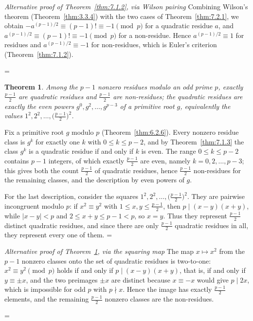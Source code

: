 \documentclass[11pt]{article}
\makeatletter
\let\nt@closedisplay\]
\def\nt@guardedclose{\@ifnextchar\par{\nt@closeafterpar}{\@ifnextchar\end{\postdisplaypenalty\@M\nt@closedisplay}{\nt@closedisplay}}}
\def\nt@closeafterpar\par{\@ifnextchar\par{\nt@closeafterpar}{\@ifnextchar\end{\postdisplaypenalty\@M\nt@closedisplay\par}{\nt@closedisplay\par}}}
\renewenvironment{proof}[1][\proofname]{\par
  \pushQED{\qed}\normalfont\topsep\medskipamount\edef\nt@afterproof{\@endparpenalty=\the\@endparpenalty\relax}\@beginparpenalty\@M\@endparpenalty\@M\let\]\nt@guardedclose\trivlist\item[]\textit{#1\@addpunct{.}} \ignorespaces}{\ifvmode\addpenalty\@M\fi\popQED\nt@afterproof\endtrivlist\@endpefalse}
\theoremstyle{ntstyle}
\newtheorem{theorem}{Theorem}[subsection]
\newenvironment{altproof}[1][\proofname]
  {\begin{proof}[#1]\renewcommand{\qedsymbol}{}}{\end{proof}}
\makeatother
\begin{document}
\begin{altproof}[Alternative proof of Theorem~\ref{thm:7.1.2}, via Wilson pairing]
\label{proof:alt-7-1-2-2} Combining Wilson's theorem (Theorem~\ref{thm:3.3.4}) with the two cases of
  Theorem~\ref{thm:7.2.1}, we obtain
  $-a^{(p-1)/2} \equiv (p-1)! \equiv -1 \pmod{p}$
  for a quadratic residue $a$, and
  $a^{(p-1)/2} \equiv (p-1)! \equiv -1 \pmod{p}$
  for a non-residue.
  Hence $a^{(p-1)/2} \equiv 1$ for residues and $a^{(p-1)/2} \equiv -1$
  for non-residues, which is Euler's criterion (Theorem~\ref{thm:7.1.2}).

\end{altproof}

\begin{theorem}\label{thm:7.2.2} Among the $p - 1$ nonzero
  residues modulo an odd prime $p$, exactly $\tfrac{p-1}{2}$ are
  quadratic residues and $\tfrac{p-1}{2}$ are non-residues; the
  quadratic residues are exactly the even powers $g^{0}, g^{2}, \ldots, g^{p-3}$ of a primitive root $g$,
  equivalently the values $1^{2}, 2^{2}, \ldots, \big(\tfrac{p-1}{2}\big)^{2}$.

\end{theorem}

\begin{proof} Fix a primitive root $g$ modulo $p$
  (Theorem~\ref{thm:6.2.6}).
  Every nonzero residue class is $g^{k}$ for exactly one $k$ with $0 \le k \le p-2$, and by Theorem~\ref{thm:7.1.3} the class
  $g^{k}$ is a quadratic residue if and only if $k$ is even. The range
  $0 \le k \le p-2$ contains $p-1$ integers, of which exactly
  $\tfrac{p-1}{2}$ are even, namely $k = 0, 2, \ldots, p-3$; this gives
  both the count $\tfrac{p-1}{2}$ of quadratic residues, hence
  $\tfrac{p-1}{2}$ non-residues for the remaining classes, and the
  description by even powers of $g$.

  For the last description, consider the squares $1^{2}, 2^{2}, \ldots, \big(\tfrac{p-1}{2}\big)^{2}$. They are
  pairwise incongruent modulo
  $p$: if $x^{2} \equiv y^{2}$ with $1 \le x, y \le \tfrac{p-1}{2}$,
  then $p \mid (x-y)(x+y)$, while $|x - y| < p$ and $2 \le x + y \le p - 1 < p$, so $x = y$. Thus they represent
  $\tfrac{p-1}{2}$ distinct
  quadratic residues, and since there are only $\tfrac{p-1}{2}$
  quadratic residues in all, they represent every one of them.
\end{proof}

\begin{altproof}[Alternative proof of Theorem~\ref{thm:7.2.2}, via the squaring map] The map $x \mapsto x^{2}$ from the $p-1$ nonzero classes onto the set of
  quadratic residues is two-to-one: $x^{2} \equiv y^{2} \pmod{p}$ holds if and
  only if $p \mid (x-y)(x+y)$, that is, if and only if $y \equiv \pm x$,
  and the two preimages $\pm x$ are distinct because $x \equiv -x$ would
  give $p \mid 2x$, which is impossible for odd $p$ with $p \nmid x$. Hence the
  image has exactly $\tfrac{p-1}{2}$ elements, and the remaining
  $\tfrac{p-1}{2}$ nonzero classes are the non-residues.

\end{altproof}
\end{document}
